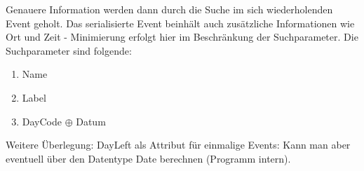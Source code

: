 \documentclass[
a4paper,
twoside,
DIV=12,
BCOR=8mm,
headlineinclude=true,
footinclude=false,
numbers=noenddot,
headheight=40pt, 11pt]{scrartcl}
\begin{document}
Genauere Information werden dann durch die Suche im sich wiederholenden Event geholt. Das serialisierte Event beinhält auch zusätzliche Informationen wie Ort und Zeit - Minimierung erfolgt hier im Beschränkung der Suchparameter. Die Suchparameter sind folgende:
\begin{enumerate}
	\item Name
	\item Label 
	\item  DayCode $\oplus$ Datum
\end{enumerate}
Weitere Überlegung: DayLeft als Attribut für einmalige Events: Kann man aber eventuell über den Datentype Date berechnen (Programm intern).
\end{document}
